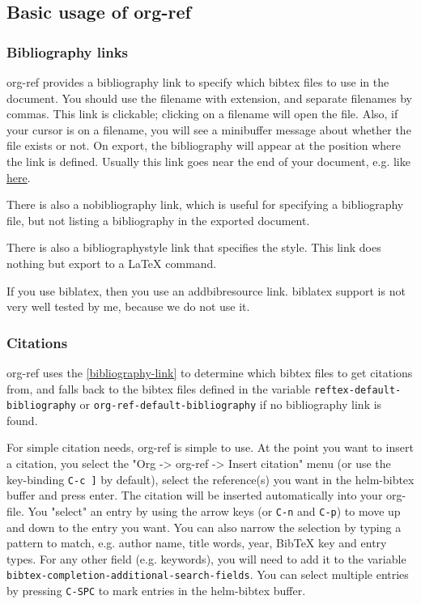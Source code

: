 \documentclass[11pt]{article}
\begin{document}
\subsection{Basic usage of org-ref}
\label{sec-1-1}

\subsubsection{Bibliography links}
\label{sec-1-1-1}
 

org-ref provides a bibliography link to specify which bibtex files to use in the document. You should use the filename with extension, and separate filenames by commas. This link is clickable; clicking on a filename will open the file. Also, if your cursor is on a filename, you will see a minibuffer message about whether the file exists or not. On export, the bibliography will appear at the position where the link is defined. Usually this link goes near the end of your document, e.g. like \hyperref[bibliography-link]{here}.

There is also a nobibliography link, which is useful for specifying a bibliography file, but not listing a bibliography in the exported document.

There is also a bibliographystyle link that specifies the style. This link does nothing but export to a \LaTeX{} command.

If you use biblatex, then you use an addbibresource link. biblatex support is not very well tested by me, because we do not use it.

\subsubsection{Citations}
\label{sec-1-1-2}

org-ref uses the \ref{bibliography-link} to determine which bibtex files to get citations from, and falls back to the bibtex files defined in the variable \verb~reftex-default-bibliography~ or \verb~org-ref-default-bibliography~ if no bibliography link is found.

For simple citation needs, org-ref is simple to use. At the point you want to insert a citation, you select the "Org -> org-ref -> Insert citation" menu (or use the key-binding \verb~C-c ]~ by default), select the reference(s) you want in the helm-bibtex buffer and press enter. The citation will be inserted automatically into your org-file. You "select" an entry by using the arrow keys (or \verb~C-n~ and \verb~C-p~) to move up and down to the entry you want. You can also narrow the selection by typing a pattern to match, e.g. author name, title words, year, BibTeX key and entry types. For any other field (e.g. keywords), you will need to add it to the variable \verb~bibtex-completion-additional-search-fields~. You can select multiple entries by pressing \verb~C-SPC~ to mark entries in the helm-bibtex buffer.
\end{document}
